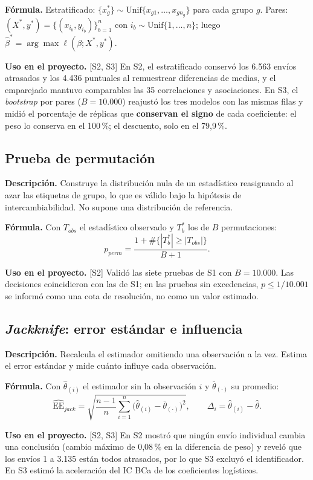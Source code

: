 \documentclass[11pt,a4paper]{article}
\newcommand{\desc}{\textbf{Descripción.} }
\newcommand{\formula}{\textbf{Fórmula.} }
\newcommand{\uso}{\textbf{Uso en el proyecto.} }
\newcommand{\fase}[1]{{\footnotesize\color{gris}[#1]}}
\begin{document}
\formula Estratificado: $\{x^{*}_{g}\}\sim\text{Unif}\{x_{g1},\dots,x_{gn_g}\}$ para cada grupo $g$. Pares: $(X^*,y^*)=\{(x_{i_b},y_{i_b})\}_{b=1}^n$ con $i_b\sim\text{Unif}\{1,\dots,n\}$; luego $\hat\beta^*=\arg\max\ell(\beta;X^*,y^*)$.

\uso \fase{S2, S3} En S2, el estratificado conservó los 6.563 envíos atrasados y los 4.436 puntuales al remuestrear diferencias de medias, y el emparejado mantuvo comparables las 35 correlaciones y asociaciones. En S3, el \emph{bootstrap} por pares ($B=10.000$) reajustó los tres modelos con las mismas filas y midió el porcentaje de réplicas que \textbf{conservan el signo} de cada coeficiente: el peso lo conserva en el 100\,\%; el descuento, solo en el 79,9\,\%.

\subsection{Prueba de permutación}
\desc Construye la distribución nula de un estadístico reasignando al azar las etiquetas de grupo, lo que es válido bajo la hipótesis de intercambiabilidad. No supone una distribución de referencia.

\formula Con $T_{obs}$ el estadístico observado y $T^*_b$ los de $B$ permutaciones:
\[
p_{perm}=\frac{1+\#\{|T^*_b|\ge|T_{obs}|\}}{B+1} .
\]

\uso \fase{S2} Validó las siete pruebas de S1 con $B=10.000$. Las decisiones coincidieron con las de S1; en las pruebas sin excedencias, $p\le1/10.001$ se informó como una cota de resolución, no como un valor estimado.

\subsection{\emph{Jackknife}: error estándar e influencia}
\desc Recalcula el estimador omitiendo una observación a la vez. Estima el error estándar y mide cuánto influye cada observación.

\formula Con $\hat\theta_{(i)}$ el estimador sin la observación $i$ y $\bar\theta_{(\cdot)}$ su promedio:
\[
\widehat{\mathrm{EE}}_{jack}=\sqrt{\frac{n-1}{n}\sum_{i=1}^n\big(\hat\theta_{(i)}-\bar\theta_{(\cdot)}\big)^2},\qquad \Delta_i=\hat\theta_{(i)}-\hat\theta .
\]

\uso \fase{S2, S3} En S2 mostró que ningún envío individual cambia una conclusión (cambio máximo de 0,08\,\% en la diferencia de peso) y reveló que los envíos 1 a 3.135 están todos atrasados, por lo que S3 excluyó el identificador. En S3 estimó la aceleración del IC BCa de los coeficientes logísticos.
\end{document}
